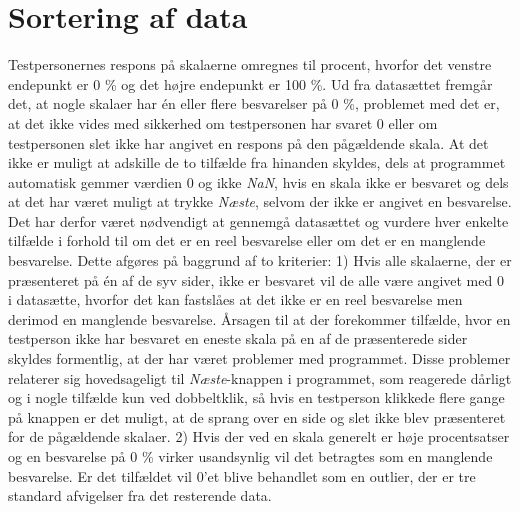 \section{Sortering af data}
\label{TestAfSkalaSorteringAfData}
%
%
Testpersonernes respons på skalaerne omregnes til procent, hvorfor det venstre endepunkt er 0 \% og det højre endepunkt er 100 \%. Ud fra datasættet fremgår det, at nogle skalaer har én eller flere besvarelser på 0 \%, problemet med det er, at det ikke vides med sikkerhed om testpersonen har svaret 0 eller om testpersonen slet ikke har angivet en respons på den pågældende skala. At det ikke er muligt at adskille de to tilfælde fra hinanden skyldes, dels at programmet automatisk gemmer værdien 0 og ikke \textit{NaN}, hvis en skala ikke er besvaret og dels at det har været muligt at trykke \textit{Næste}, selvom der ikke er angivet en besvarelse. Det har derfor været nødvendigt at gennemgå datasættet og vurdere hver enkelte tilfælde i forhold til om det er en reel besvarelse eller om det er en manglende besvarelse. Dette afgøres på baggrund af to kriterier: 1) Hvis alle skalaerne, der er præsenteret på én af de syv sider, ikke er besvaret vil de alle være angivet med 0 i datasætte, hvorfor det kan fastslåes at det ikke er en reel besvarelse men derimod en manglende besvarelse. Årsagen til at der forekommer tilfælde, hvor en testperson ikke har besvaret en eneste skala på en af de præsenterede sider skyldes formentlig, at der har været problemer med programmet. Disse problemer relaterer sig hovedsageligt til \textit{Næste}-knappen i programmet, som reagerede dårligt og i nogle tilfælde kun ved dobbeltklik, så hvis en testperson klikkede flere gange på knappen er det muligt, at de sprang over en side og slet ikke blev præsenteret for de pågældende skalaer. 2) Hvis der ved en skala generelt er høje procentsatser og en besvarelse på 0 \% virker usandsynlig vil det betragtes som en manglende besvarelse. Er det tilfældet vil 0'et blive behandlet som en outlier, der er tre standard afvigelser fra det resterende data.

